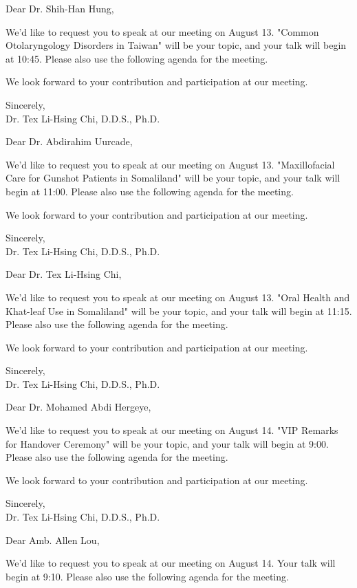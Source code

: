 \documentclass[25pt, a4paper]{letter}
\newcommand{\yourName}{Dr. Tex Li-Hsing Chi, D.D.S., Ph.D.}
\begin{document}
\clearpage
Dear Dr. Shih-Han Hung,

We'd like to request you to speak at our meeting on August 13. "Common Otolaryngology Disorders in Taiwan" will be your topic, and your talk will begin at 10:45. Please also use the following agenda for the meeting.

We look forward to your contribution and participation at our meeting.

Sincerely, \\
\yourName


\clearpage

Dear Dr. Abdirahim Uurcade,

We'd like to request you to speak at our meeting on August 13. "Maxillofacial Care for Gunshot Patients in Somaliland" will be your topic, and your talk will begin at 11:00. Please also use the following agenda for the meeting.

We look forward to your contribution and participation at our meeting.

Sincerely, \\
\yourName


\clearpage

Dear Dr. Tex Li-Hsing Chi,

We'd like to request you to speak at our meeting on August 13. "Oral Health and Khat-leaf Use in Somaliland" will be your topic, and your talk will begin at 11:15. Please also use the following agenda for the meeting.

We look forward to your contribution and participation at our meeting.

Sincerely, \\
\yourName


\clearpage



Dear Dr. Mohamed Abdi Hergeye,

We'd like to request you to speak at our meeting on August 14. "VIP Remarks for Handover Ceremony" will be your topic, and your talk will begin at 9:00. Please also use the following agenda for the meeting.

We look forward to your contribution and participation at our meeting.

Sincerely, \\
\yourName


\clearpage

Dear Amb. Allen Lou,

We'd like to request you to speak at our meeting on August 14. Your talk will begin at 9:10. Please also use the following agenda for the meeting.
\end{document}
